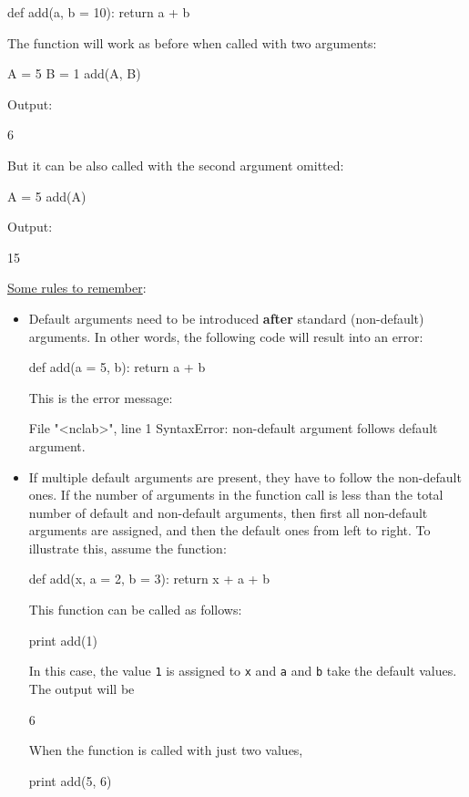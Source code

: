 \begin{bluecode}
def add(a, b = 10):
    return a + b
\end{bluecode}
The function will work as before when called with two arguments: 

\begin{bluecode}
A = 5
B = 1
add(A, B)
\end{bluecode}
Output:
\begin{greencode}
6
\end{greencode}
But it can be also called with the second argument omitted:
\begin{bluecode}
A = 5
add(A)
\end{bluecode}
Output:
\begin{greencode}
15
\end{greencode}
\underline{Some rules to remember}:
\begin{itemize}
\item Default arguments need to be introduced {\bf after} standard (non-default) arguments. In other words, the 
      following code will result into an error:
\begin{bluecode}
def add(a = 5, b):
    return a + b
\end{bluecode}
This is the error message:
\begin{redcode}
File "<nclab>", line 1
SyntaxError: non-default argument follows default argument.
\end{redcode}
\item If multiple default arguments are present, they have to follow the non-default ones.
      If the number of arguments in the function call is less than the total number of default and non-default
      arguments, then first all non-default arguments are assigned, and then the default ones from 
      left to right. To illustrate this, assume the function:
\begin{bluecode}
def add(x, a = 2, b = 3):
    return x + a + b
\end{bluecode}
This function can be called as follows:
\begin{bluecode}
print add(1)
\end{bluecode}
In this case, the value {\tt 1} is assigned to {\tt x} and {\tt a} and {\tt b} take the default values.
The output will be 
\begin{greencode}
6
\end{greencode}
When the function is called with just two values,
\begin{bluecode}
print add(5, 6)
\end{bluecode}

\end{itemize}
